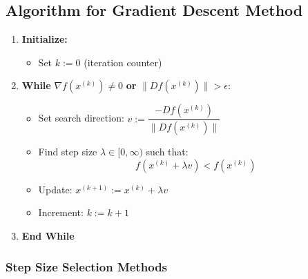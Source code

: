 \documentclass{article}
\begin{document}
\subsection{Algorithm for Gradient Descent Method}
\begin{enumerate}
    \item \textbf{Initialize:}
    \begin{itemize}
    \item Set $k := 0$ (iteration counter)
    \end{itemize}
    
    \item \textbf{While} $\nabla f(x^{(k)}) \neq 0$ \textbf{or} $\|Df(x^{(k)})\| > \epsilon$:
    \begin{itemize}
    \item Set search direction: $v := \dfrac{-Df(x^{(k)})}{\|Df(x^{(k)})\|}$
    \item Find step size $\lambda \in [0, \infty)$ such that:
    \[ f(x^{(k)} + \lambda v) < f(x^{(k)}) \]
    \item Update: $x^{(k+1)} := x^{(k)} + \lambda v$
    \item Increment: $k := k + 1$
    \end{itemize}
    
    \item \textbf{End While}
    \end{enumerate}
    
    \subsubsection*{Step Size Selection Methods}
    
\end{document}
